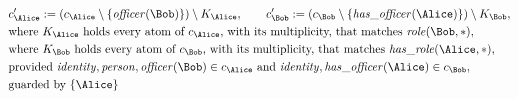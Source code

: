 \begin{align*}
&
c'_
{
\Alice
}
 := 
(c_
{
\Alice
}
 \setminus 
\{
\mathit{\detokenize{
officer
}}
(
\Bob
)
\}
) \setminus K_
{
\Alice
}
, \qquad 
c'_
{
\Bob
}
 := 
(c_
{
\Bob
}
 \setminus 
\{
\mathit{\detokenize{
has_officer
}}
(
\Alice
)
\}
) \setminus K_
{
\Bob
}
,\\
&
\text{where } K_
{
\Alice
}
 \text{ holds every atom of } c_
{
\Alice
}
 \text{, with its multiplicity, that matches } 
\mathit{\detokenize{
role
}}
(
\Bob
,
\ast
)
,\\
&
\text{where } K_
{
\Bob
}
 \text{ holds every atom of } c_
{
\Bob
}
 \text{, with its multiplicity, that matches } 
\mathit{\detokenize{
has_role
}}
(
\Alice
,
\ast
)
,\\
&
\text{provided } 
\mathit{\detokenize{
identity
}}
,
\mathit{\detokenize{
person
}}
,
\mathit{\detokenize{
officer
}}
(
\Bob
)
 \in c_
{
\Alice
}
 \text{ and } 
\mathit{\detokenize{
identity
}}
,
\mathit{\detokenize{
has_officer
}}
(
\Alice
)
 \in c_
{
\Bob
}
,\\
&
\text{guarded by } \{
\Alice
\}
\end{align*}

